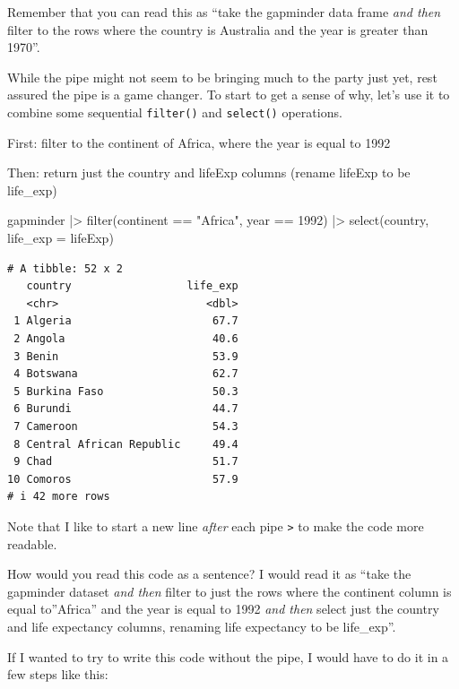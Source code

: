 \documentclass[
  letterpaper,
  DIV=11,
  numbers=noendperiod]{scrreprt}
\newenvironment{Shaded}{\begin{snugshade}}{\end{snugshade}}
\newcommand{\AttributeTok}[1]{\textcolor[rgb]{0.40,0.45,0.13}{#1}}
\newcommand{\DecValTok}[1]{\textcolor[rgb]{0.68,0.00,0.00}{#1}}
\newcommand{\FunctionTok}[1]{\textcolor[rgb]{0.28,0.35,0.67}{#1}}
\newcommand{\NormalTok}[1]{\textcolor[rgb]{0.00,0.23,0.31}{#1}}
\newcommand{\SpecialCharTok}[1]{\textcolor[rgb]{0.37,0.37,0.37}{#1}}
\newcommand{\StringTok}[1]{\textcolor[rgb]{0.13,0.47,0.30}{#1}}
\begin{document}
Remember that you can read this as ``take the gapminder data frame
\emph{and then} filter to the rows where the country is Australia and
the year is greater than 1970''.

While the pipe might not seem to be bringing much to the party just yet,
rest assured the pipe is a game changer. To start to get a sense of why,
let's use it to combine some sequential \texttt{filter()} and
\texttt{select()} operations.

First: filter to the continent of Africa, where the year is equal to
1992

Then: return just the country and lifeExp columns (rename lifeExp to be
life\_exp)

\begin{Shaded}
\begin{Highlighting}[]
\NormalTok{gapminder }\SpecialCharTok{|\textgreater{}} 
  \FunctionTok{filter}\NormalTok{(continent }\SpecialCharTok{==} \StringTok{"Africa"}\NormalTok{, year }\SpecialCharTok{==} \DecValTok{1992}\NormalTok{) }\SpecialCharTok{|\textgreater{}} 
  \FunctionTok{select}\NormalTok{(country, }\AttributeTok{life\_exp =}\NormalTok{ lifeExp)}
\end{Highlighting}
\end{Shaded}

\begin{verbatim}
# A tibble: 52 x 2
   country                  life_exp
   <chr>                       <dbl>
 1 Algeria                      67.7
 2 Angola                       40.6
 3 Benin                        53.9
 4 Botswana                     62.7
 5 Burkina Faso                 50.3
 6 Burundi                      44.7
 7 Cameroon                     54.3
 8 Central African Republic     49.4
 9 Chad                         51.7
10 Comoros                      57.9
# i 42 more rows
\end{verbatim}

Note that I like to start a new line \emph{after} each pipe
\texttt{\textbar{}\textgreater{}} to make the code more readable.

How would you read this code as a sentence? I would read it as ``take
the gapminder dataset \emph{and then} filter to just the rows where the
continent column is equal to''Africa'' and the year is equal to 1992
\emph{and then} select just the country and life expectancy columns,
renaming life expectancy to be life\_exp''.

If I wanted to try to write this code without the pipe, I would have to
do it in a few steps like this:
\end{document}
